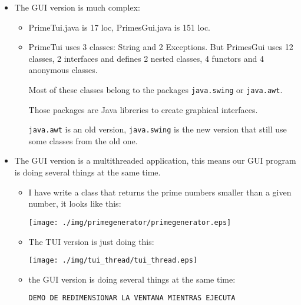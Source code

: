 \documentclass[a4paper, 9pt]{extarticle}
\begin{document}
\begin{itemize}

  \item The GUI version is much complex:

    \begin{itemize}

      \item PrimeTui.java is 17 loc, PrimesGui.java is 151 loc.

      \item PrimeTui uses 3 classes: String and 2 Exceptions. But PrimesGui
        uses 12 classes, 2 interfaces and defines 2 nested classes, 4 functors
        and 4 anonymous classes.

        Most of these classes belong to the packages \verb+java.swing+ or
        \verb+java.awt+.

        Those packages are Java libreries to create graphical interfaces.

        \verb+java.awt+ is an old version, \verb+java.swing+ is the new version
        that still use some classes from the old one.

    \end{itemize}

  \item The GUI version is a multithreaded application, this means our GUI
    program is doing several things at the same time.

    \begin{itemize}

      \item I have write a class that returns the prime numbers smaller than a
        given number, it looks like this:

        \begin{center}
          \texttt{[image: ./img/primegenerator/primegenerator.eps]}
        \end{center}

      \item The TUI version is just doing this:

        \begin{center}
          \texttt{[image: ./img/tui\_thread/tui\_thread.eps]}
        \end{center}

      \item the GUI version is doing several things at the same time:

        \verb+DEMO DE REDIMENSIONAR LA VENTANA MIENTRAS EJECUTA+


\end{itemize}
\end{itemize}
\end{document}

